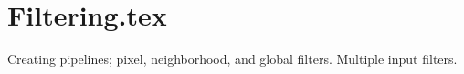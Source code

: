 \chapter{Filtering.tex}

Creating pipelines; pixel, neighborhood, and global filters. Multiple input filters.

